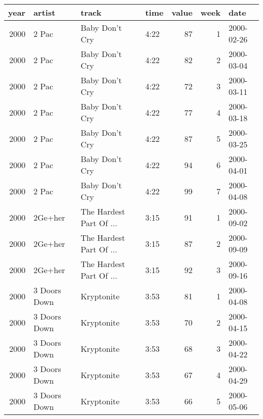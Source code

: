 \begin{tabular}{rlllrrl}
  \toprule
 year & artist & track & time & value & week & date \\ 
  \midrule
  2000 & 2 Pac & Baby Don't Cry & 4:22 &  87 &   1 & 2000-02-26 \\ 
  2000 & 2 Pac & Baby Don't Cry & 4:22 &  82 &   2 & 2000-03-04 \\ 
  2000 & 2 Pac & Baby Don't Cry & 4:22 &  72 &   3 & 2000-03-11 \\ 
  2000 & 2 Pac & Baby Don't Cry & 4:22 &  77 &   4 & 2000-03-18 \\ 
  2000 & 2 Pac & Baby Don't Cry & 4:22 &  87 &   5 & 2000-03-25 \\ 
  2000 & 2 Pac & Baby Don't Cry & 4:22 &  94 &   6 & 2000-04-01 \\ 
  2000 & 2 Pac & Baby Don't Cry & 4:22 &  99 &   7 & 2000-04-08 \\ 
  2000 & 2Ge+her & The Hardest Part Of ... & 3:15 &  91 &   1 & 2000-09-02 \\ 
  2000 & 2Ge+her & The Hardest Part Of ... & 3:15 &  87 &   2 & 2000-09-09 \\ 
  2000 & 2Ge+her & The Hardest Part Of ... & 3:15 &  92 &   3 & 2000-09-16 \\ 
  2000 & 3 Doors Down & Kryptonite & 3:53 &  81 &   1 & 2000-04-08 \\ 
  2000 & 3 Doors Down & Kryptonite & 3:53 &  70 &   2 & 2000-04-15 \\ 
  2000 & 3 Doors Down & Kryptonite & 3:53 &  68 &   3 & 2000-04-22 \\ 
  2000 & 3 Doors Down & Kryptonite & 3:53 &  67 &   4 & 2000-04-29 \\ 
  2000 & 3 Doors Down & Kryptonite & 3:53 &  66 &   5 & 2000-05-06 \\ 
   \bottomrule
\end{tabular}

